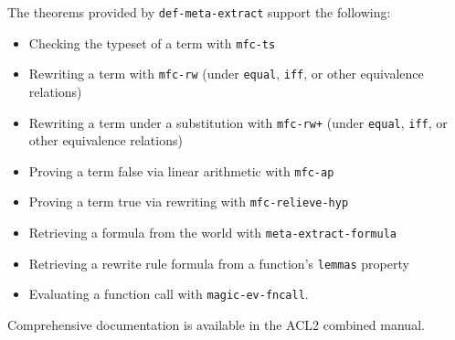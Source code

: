 The theorems provided by \texttt{def-meta-extract} support the following:
\begin{itemize}
\item Checking the typeset of a term with \texttt{mfc-ts}
\item Rewriting a term with \texttt{mfc-rw}
  (under \texttt{equal}, \texttt{iff}, or other equivalence relations)
\item Rewriting a term under a substitution with \texttt{mfc-rw+}
  (under \texttt{equal}, \texttt{iff}, or other equivalence relations)
\item Proving a term false via linear arithmetic with \texttt{mfc-ap}
\item Proving a term true via rewriting with \texttt{mfc-relieve-hyp}
\item Retrieving a formula from the world with \texttt{meta-extract-formula}
\item Retrieving a rewrite rule formula from a function's \texttt{lemmas} property
\item Evaluating a function call with \texttt{magic-ev-fncall}.
\end{itemize}
Comprehensive documentation is available in the ACL2 combined manual.

